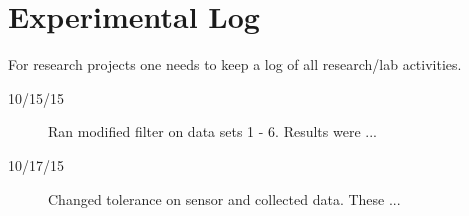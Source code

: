 
\chapter{Experimental Log}

For research projects one needs to keep a log of all research/lab activities.   


\begin{description}
\item [10/15/15]  Ran modified filter on data sets 1 - 6.  Results were ...
\item [10/17/15]  Changed tolerance on sensor and collected data.  These ...
\end{description}